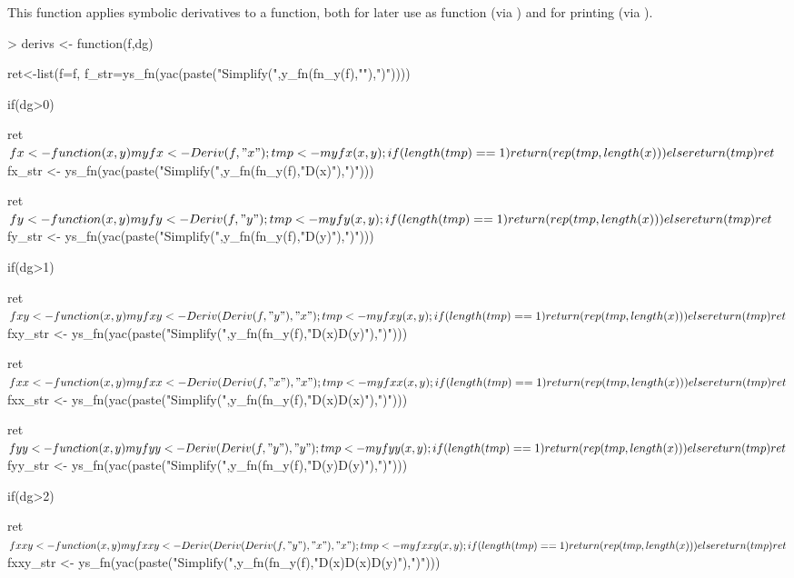 \documentclass[nojss]{jss}
\begin{document}
This function applies symbolic derivatives to a  function,
both for later use as  function (via ) and for
printing (via ).

\begin{Schunk}
\begin{Sinput}
> derivs <- function(f,dg){
     ret<-list(f=f,
               f_str=ys_fn(yac(paste("Simplify(",y_fn(fn_y(f),""),")"))))
 
     if(dg>0){
 
         ret$fx <- function(x,y){
             myfx <- Deriv(f,"x");
             tmp <- myfx(x,y);
             if(length(tmp)==1)
                 return(rep(tmp,length(x)))
             else
                 return(tmp)
         }
         ret$fx_str  <- ys_fn(yac(paste("Simplify(",y_fn(fn_y(f),"D(x)"),")")))
 
 
         ret$fy <- function(x,y){
             myfy <- Deriv(f,"y");
             tmp <- myfy(x,y);
             if(length(tmp)==1)
                 return(rep(tmp,length(x)))
             else
                 return(tmp)
         }
         ret$fy_str  <- ys_fn(yac(paste("Simplify(",y_fn(fn_y(f),"D(y)"),")")))
 
 
         if(dg>1){
             ret$fxy <- function(x,y){
                 myfxy <- Deriv(Deriv(f,"y"),"x");
                 tmp <- myfxy(x,y);
                 if(length(tmp)==1)
                     return(rep(tmp,length(x)))
                 else
                     return(tmp)
             }
             ret$fxy_str  <- ys_fn(yac(paste("Simplify(",y_fn(fn_y(f),"D(x)D(y)"),")")))
 
             ret$fxx <- function(x,y){
                 myfxx <- Deriv(Deriv(f,"x"),"x");
                 tmp <- myfxx(x,y);
                 if(length(tmp)==1)
                     return(rep(tmp,length(x)))
                 else
                     return(tmp)
             }
             ret$fxx_str  <- ys_fn(yac(paste("Simplify(",y_fn(fn_y(f),"D(x)D(x)"),")")))
 
             ret$fyy <- function(x,y){
                 myfyy <- Deriv(Deriv(f,"y"),"y");
                 tmp <- myfyy(x,y);
                 if(length(tmp)==1)
                     return(rep(tmp,length(x)))
                 else
                     return(tmp)
             }
             ret$fyy_str  <- ys_fn(yac(paste("Simplify(",y_fn(fn_y(f),"D(y)D(y)"),")")))
 
             if(dg>2){
                 ret$fxxy <- function(x,y){
                     myfxxy <- Deriv(Deriv(Deriv(f,"y"),"x"),"x");
                     tmp <- myfxxy(x,y);
                     if(length(tmp)==1)
                         return(rep(tmp,length(x)))
                     else
                         return(tmp)
                 }
                 ret$fxxy_str  <- ys_fn(yac(paste("Simplify(",y_fn(fn_y(f),"D(x)D(x)D(y)"),")")))
 
}}}}
\end{Sinput}
\end{Schunk}
\end{document}
